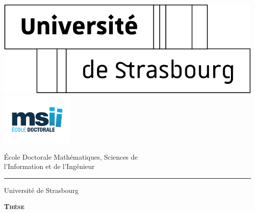 \newcommand{\thetitle}{Nouvelles approches radiomiques \\ \vspace{-0.2pt}
pour la caractérisation de tumeurs hépatiques \\ \vspace{-3pt} par analyse d'image}
%
\begin{titlingpage} 
	\renewcommand{\baselinestretch}{0}
	\renewcommand{\arraystretch}{0.75}
	
	\hspace{-.7cm}
	\includegraphics[width=.23\linewidth]{Logo/logo_unistra}\hfill
	\includegraphics[width=0.27\textwidth]{Logo/logo_msii}
	\begin{minipage}{\linewidth}
	\end{minipage}
	
	\begin{center}
		{\LARGE \'{E}cole Doctorale Math\'{e}matiques, Sciences de \\l'Information et de l'Ing\'{e}nieur}
		\vspace{.5mm}
		\hrule
		\vspace{2.5mm}
		{\LARGE  Université de Strasbourg}
		
		\vspace{1\baselineskip}
		
		{\Huge \textbf {\textsc{Thèse}}}
		

\end{center}
\end{titlingpage}
